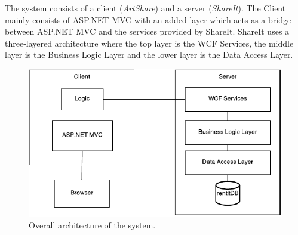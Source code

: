 \documentclass[../report.tex]{subfiles}
\begin{document}
\graphicspath{{img/}{../img/}}

The system consists of a client (\textit{ArtShare}) and a server (\textit{ShareIt}). 
The Client mainly consists of ASP.NET MVC with an added layer which acts as a bridge between ASP.NET MVC and the services provided by ShareIt. 
ShareIt uses a three-layered architecture where the top layer is the WCF Services, the middle layer is the Business Logic Layer and the lower layer is the Data Access Layer. 
\begin{figure}[H]
\centering
\includegraphics{overall_architecture.pdf}
\caption{Overall architecture of the system.}
\end{figure}
\end{document}
